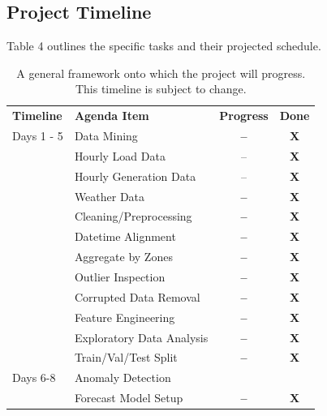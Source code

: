 \documentclass[sigconf]{acmart}
\begin{document}
\subsection{Project Timeline}

Table 4 outlines the specific tasks and their projected schedule.

\begin{table}[hbt!]
\centering
\caption{A general framework onto which the project will progress. This timeline is subject to change.}
\begin{tabular}{ll | c | c}
\toprule
\textbf{Timeline} & \textbf{Agenda Item} & \hfil \textbf{Progress} & \hfil \textbf{Done} \\
\cmidrule(rl){1-1}\cmidrule(rl){2-2}\cmidrule(rl){3-3}\cmidrule(rl){4-4}
  Days 1 - 5 & Data Mining & \textbf{--} & \textbf{X} \\
  \cmidrule(rl){1-4}
   & \hspace{3mm}Hourly Load Data & -- & \textbf{X} \\   
   & \hspace{3mm}Hourly Generation Data & -- & \textbf{X} \\   
   & \hspace{3mm}Weather Data & \textbf{--} & \textbf{X}\\   
   & Cleaning/Preprocessing & \textbf{--} & \textbf{X}\\  
   \cmidrule(rl){2-4} 
   & \hspace{3mm}Datetime Alignment & \textbf{--} & \textbf{X}\\   
   & \hspace{3mm}Aggregate by Zones & \textbf{--} & \textbf{X}\\   
   & \hspace{3mm}Outlier Inspection & \textbf{--} & \textbf{X}\\   
   & \hspace{3mm}Corrupted Data Removal & \textbf{--} & \textbf{X}\\  
   & Feature Engineering & \textbf{--} & \textbf{X}\\  
   & Exploratory Data Analysis & \textbf{--} & \textbf{X}\\  
   \cmidrule(rl){2-4} 
   & Train/Val/Test Split &\textbf{--} & \textbf{X}\\  
   \cmidrule(rl){2-4} 
  Days 6-8 & Anomaly Detection & & \\  
   \cmidrule(rl){1-4} 
   & Forecast Model Setup &\textbf{--} & \textbf{X}\\  
   \cmidrule(rl){2-4} 

\end{tabular}
\end{table}
\end{document}
